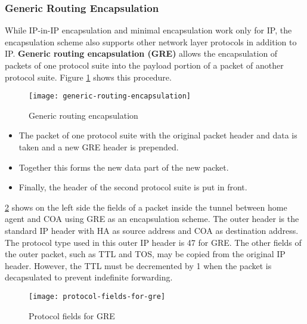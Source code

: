 \subsubsection{Generic Routing Encapsulation}
While IP-in-IP encapsulation and minimal encapsulation work only for IP, the encapsulation scheme also supports other network layer protocols in addition to IP. \textbf{Generic routing encapsulation (GRE)} allows the encapsulation of packets of one protocol suite into the payload portion of a packet of another
protocol suite. Figure \ref{fig:generic-routing-encapsulation} shows this procedure. 


\begin{figure}[hb!]
	\centering
	\texttt{[image: generic-routing-encapsulation]}
	\caption{Generic routing encapsulation}\label{fig:generic-routing-encapsulation}
\end{figure}

\begin{itemize}
	\item The packet of one protocol suite with the original packet header and data is taken and a new GRE header is prepended. 
	\item Together this forms the new data part of the new	packet. 
	\item Finally, the header of the second protocol suite is put in front.
\end{itemize}


\ref{fig:protocol-fields-for-gre} shows on the left side the fields of a packet inside the tunnel
between home agent and COA using GRE as an encapsulation scheme. The outer header is the standard IP header with HA as source
address and COA as destination address. The protocol type used in this outer IP header is 47 for GRE. The other fields of the outer packet, such as TTL and TOS,
may be copied from the original IP header. However, the TTL must be decremented by 1 when the packet is decapsulated to prevent indefinite forwarding.

	
	\begin{figure}[ht!]
	\centering
	\texttt{[image: protocol-fields-for-gre]}
	\caption{Protocol fields for GRE}\label{fig:protocol-fields-for-gre}
	\end{figure}
	
